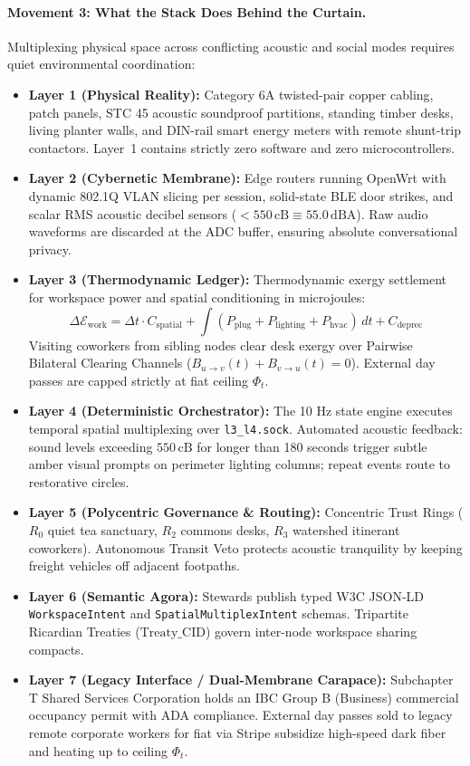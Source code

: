\paragraph{Movement 3: What the Stack Does Behind the Curtain.}
Multiplexing physical space across conflicting acoustic and social modes requires quiet environmental coordination:
\begin{itemize}
    \item \textbf{Layer 1 (Physical Reality):} Category 6A twisted-pair copper cabling, patch panels, STC 45 acoustic soundproof partitions, standing timber desks, living planter walls, and DIN-rail smart energy meters with remote shunt-trip contactors. Layer~1 contains strictly zero software and zero microcontrollers.
    \item \textbf{Layer 2 (Cybernetic Membrane):} Edge routers running OpenWrt with dynamic 802.1Q VLAN slicing per session, solid-state BLE door strikes, and scalar RMS acoustic decibel sensors ($< 550\,\mathrm{cB} \equiv 55.0\,\mathrm{dBA}$). Raw audio waveforms are discarded at the ADC buffer, ensuring absolute conversational privacy.
    \item \textbf{Layer 3 (Thermodynamic Ledger):} Thermodynamic exergy settlement for workspace power and spatial conditioning in microjoules:
    \[
    \Delta \mathcal{E}_{\mathrm{work}} = \Delta t \cdot C_{\mathrm{spatial}} + \int (P_{\mathrm{plug}} + P_{\mathrm{lighting}} + P_{\mathrm{hvac}}) \, dt + C_{\mathrm{deprec}}
    \]
    Visiting coworkers from sibling nodes clear desk exergy over Pairwise Bilateral Clearing Channels ($B_{u \to v}(t) + B_{v \to u}(t) = 0$). External day passes are capped strictly at fiat ceiling $\Phi_t$.
    \item \textbf{Layer 4 (Deterministic Orchestrator):} The 10 Hz state engine executes temporal spatial multiplexing over \texttt{l3\_l4.sock}. Automated acoustic feedback: sound levels exceeding $550\,\mathrm{cB}$ for longer than 180 seconds trigger subtle amber visual prompts on perimeter lighting columns; repeat events route to restorative circles.
    \item \textbf{Layer 5 (Polycentric Governance \& Routing):} Concentric Trust Rings ($R_0$ quiet tea sanctuary, $R_2$ commons desks, $R_3$ watershed itinerant coworkers). Autonomous Transit Veto protects acoustic tranquility by keeping freight vehicles off adjacent footpaths.
    \item \textbf{Layer 6 (Semantic Agora):} Stewards publish typed W3C JSON-LD \texttt{WorkspaceIntent} and \texttt{SpatialMultiplexIntent} schemas. Tripartite Ricardian Treaties ($\mathrm{Treaty\_CID}$) govern inter-node workspace sharing compacts.
    \item \textbf{Layer 7 (Legacy Interface / Dual-Membrane Carapace):} Subchapter T Shared Services Corporation holds an IBC Group B (Business) commercial occupancy permit with ADA compliance. External day passes sold to legacy remote corporate workers for fiat via Stripe subsidize high-speed dark fiber and heating up to ceiling $\Phi_t$.
\end{itemize}

